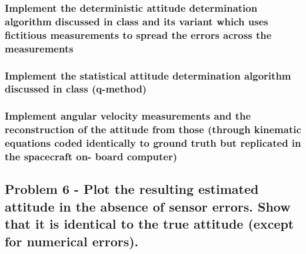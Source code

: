 \subsubsection{Implement the deterministic attitude determination algorithm discussed in class and its variant which uses fictitious measurements to spread the errors across the measurements}

\subsubsection{Implement the statistical attitude determination algorithm discussed in class (q-method)}

\subsubsection{Implement angular velocity measurements and the reconstruction of the attitude from those (through kinematic equations coded identically to ground truth but replicated in the spacecraft on- board computer)}

\subsection{Problem 6 - Plot the resulting estimated attitude in the absence of sensor errors. Show that it is identical to the true attitude (except for numerical errors).}